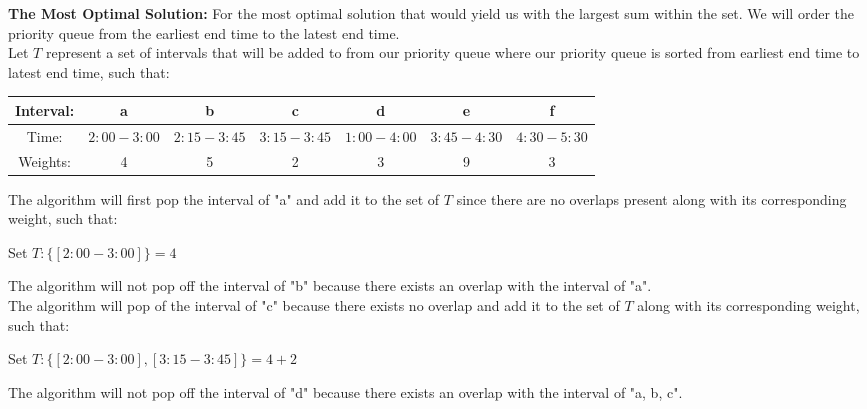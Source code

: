 \documentclass[11pt]{article}
\theoremstyle{definition}
\theoremstyle{definition}
\theoremstyle{definition}
\begin{document}
\textbf{The  Most Optimal Solution:}
For the most optimal solution that would yield us with the largest sum within the set. We will order the priority queue from the earliest end time to the latest end time. \\

Let $T$ represent a set of intervals that will be added to from our priority queue where our priority queue is sorted from earliest end time to latest end time, such that: \\
\begin{center}
\begin{tabular}{ | c | c | c | c | c | c | c | }
 \hline
 Interval:& a & b & c & d & e & f\\  
 \hline
 Time: & $2:00 - 3:00$ & $2:15 - 3:45$ & $3:15 - 3:45$ & $1:00 - 4:00$  & $3:45 - 4:30$ & $4:30 - 5:30$\\
  \hline
  Weights: & 4 & 5 & 2 & 3 & 9 & 3 \\
  \hline
\end{tabular}
\end{center}

The algorithm will first pop the interval of "a" and add it to the set of $T$ since there are no overlaps present along with its corresponding weight, such that: \\
\begin{center}
Set $T: \{[2:00 - 3:00]\} = 4$\\
\end{center}

The algorithm will not pop off the interval of "b" because there exists an overlap with the interval of "a". \\

The algorithm will pop of the interval of "c" because there exists no overlap and add it to the set of $T$ along with its corresponding weight, such that: \\
\begin{center}
Set $T: \{[2:00 - 3:00], [3:15 - 3:45]\} = 4 + 2$\\
\end{center}

The algorithm will not pop off the interval of "d" because there exists an overlap with the interval of "a, b, c". \\
\end{document}
